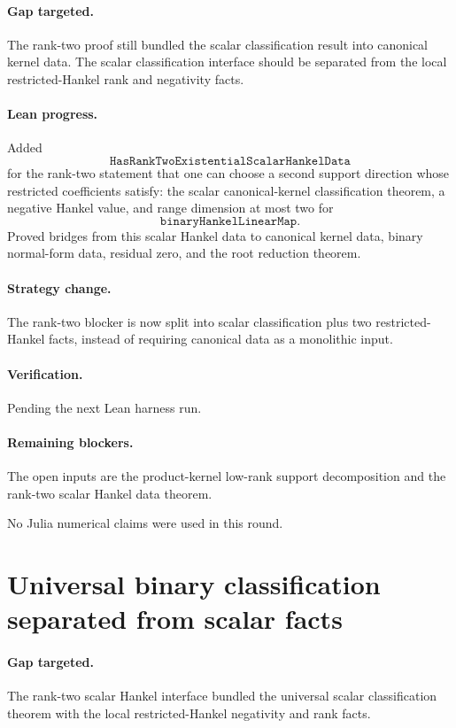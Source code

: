 \documentclass[11pt]{article}
\begin{document}
\paragraph{Gap targeted.}
The rank-two proof still bundled the scalar classification result into
canonical kernel data.  The scalar classification interface should be
separated from the local restricted-Hankel rank and negativity facts.

\paragraph{Lean progress.}
Added
\[
\texttt{HasRankTwoExistentialScalarHankelData}
\]
for the rank-two statement that one can choose a second support direction
whose restricted coefficients satisfy:
the scalar canonical-kernel classification theorem, a negative Hankel value,
and range dimension at most two for
\[
\texttt{binaryHankelLinearMap}.
\]
Proved bridges from this scalar Hankel data to canonical kernel data, binary
normal-form data, residual zero, and the root reduction theorem.

\paragraph{Strategy change.}
The rank-two blocker is now split into scalar classification plus two
restricted-Hankel facts, instead of requiring canonical data as a monolithic
input.

\paragraph{Verification.}
Pending the next Lean harness run.

\paragraph{Remaining blockers.}
The open inputs are the product-kernel low-rank support decomposition and the
rank-two scalar Hankel data theorem.

No Julia numerical claims were used in this round.

\section*{Universal binary classification separated from scalar facts}

\paragraph{Gap targeted.}
The rank-two scalar Hankel interface bundled the universal scalar
classification theorem with the local restricted-Hankel negativity and rank
facts.
\end{document}
